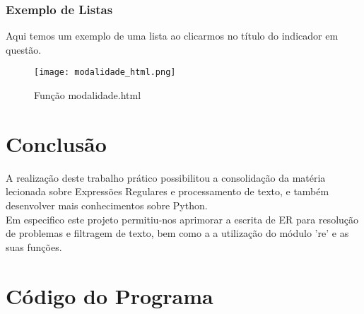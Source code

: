 \documentclass[11pt,a4paper]{report}%
\begin{document}
\subsection{Exemplo de Listas} \label{subsec:exLista}
Aqui temos um exemplo de uma lista ao clicarmos no título do indicador em questão.
\begin{figure}[htbp]
\centerline{\texttt{[image: modalidade\_html.png]}}
\caption{Função modalidade.html}
\label{fig}
\end{figure}

\chapter{Conclusão} \label{concl}
A realização deste trabalho prático possibilitou a consolidação da matéria lecionada sobre Expressões Regulares e processamento de texto, e também desenvolver mais conhecimentos sobre Python.\\
Em especifico este projeto permitiu-nos aprimorar a escrita de ER para resolução de problemas e filtragem de texto, bem como a a utilização do módulo 're' e as suas funções.\\
\appendix %
\chapter{Código do Programa}
\end{document}
